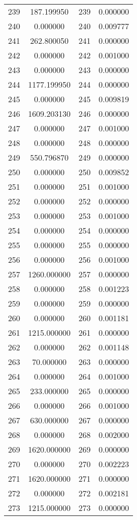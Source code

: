 \documentclass[12pt]{article}
\begin{document}
\begin{longtable}{@{}cccc@{}}
239 & 187.199950 & 239 & 0.000000 \\
240 & 0.000000 & 240 & 0.009777 \\
241 & 262.800050 & 241 & 0.000000 \\
242 & 0.000000 & 242 & 0.001000 \\
243 & 0.000000 & 243 & 0.000000 \\
244 & 1177.199950 & 244 & 0.000000 \\
245 & 0.000000 & 245 & 0.009819 \\
246 & 1609.203130 & 246 & 0.000000 \\
247 & 0.000000 & 247 & 0.001000 \\
248 & 0.000000 & 248 & 0.000000 \\
249 & 550.796870 & 249 & 0.000000 \\
250 & 0.000000 & 250 & 0.009852 \\
251 & 0.000000 & 251 & 0.001000 \\
252 & 0.000000 & 252 & 0.000000 \\
253 & 0.000000 & 253 & 0.001000 \\
254 & 0.000000 & 254 & 0.000000 \\
255 & 0.000000 & 255 & 0.000000 \\
256 & 0.000000 & 256 & 0.001000 \\
257 & 1260.000000 & 257 & 0.000000 \\
258 & 0.000000 & 258 & 0.001223 \\
259 & 0.000000 & 259 & 0.000000 \\
260 & 0.000000 & 260 & 0.001181 \\
261 & 1215.000000 & 261 & 0.000000 \\
262 & 0.000000 & 262 & 0.001148 \\
263 & 70.000000 & 263 & 0.000000 \\
264 & 0.000000 & 264 & 0.001000 \\
265 & 233.000000 & 265 & 0.000000 \\
266 & 0.000000 & 266 & 0.001000 \\
267 & 630.000000 & 267 & 0.000000 \\
268 & 0.000000 & 268 & 0.002000 \\
269 & 1620.000000 & 269 & 0.000000 \\
270 & 0.000000 & 270 & 0.002223 \\
271 & 1620.000000 & 271 & 0.000000 \\
272 & 0.000000 & 272 & 0.002181 \\
273 & 1215.000000 & 273 & 0.000000 \\

\end{longtable}
\end{document}
